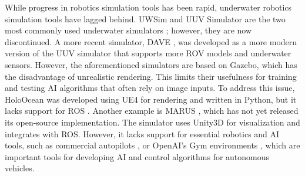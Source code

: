 While progress in robotics simulation tools has been rapid, underwater robotics simulation tools have lagged behind. UWSim \cite{uwsim} and UUV Simulator \cite{uuv} are the two most commonly used underwater simulators \cite{simulator:survey}; however, they are now discontinued. %
A more recent simulator, DAVE \cite{projectdave}, was developed as a more modern version of the UUV simulator that supports more \ac{ROV} models and underwater sensors. However, the aforementioned simulators are based on Gazebo, which has the disadvantage of unrealistic rendering. This limits their usefulness for training and testing \ac{AI} algorithms that often rely on image inputs. To address this issue, HoloOcean \cite{holoocean} was developed using \ac{UE4} for rendering and written in Python, but it lacks support for \ac{ROS} \cite{ros}. Another example is MARUS \cite{marus}, which has not yet released its open-source implementation. The simulator uses Unity3D for visualization and integrates with \ac{ROS}. However, it lacks support for essential robotics and \ac{AI} tools, such as commercial autopilots \cite{px4}, or OpenAI's Gym environments \cite{simulator:openai_gym}, which are important tools for developing \ac{AI} and control algorithms for autonomous vehicles.
%
